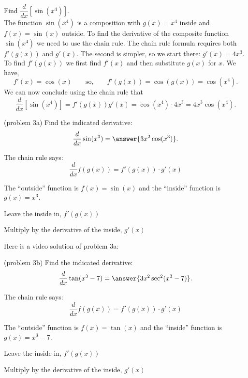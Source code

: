 \documentclass[handout]{ximera}
\begin{document}
\begin{example}[example 3]
Find $\dfrac{d}{dx}\left[\sin(x^4)\right]$.\\
The function $\sin(x^4)$ is a composition with $g(x) = x^4$ inside and $f(x) = \sin(x)$ outside.
To find the derivative of the composite function $\sin(x^4)$ we need to use the chain rule.
The chain rule formula requires both $f'(g(x))$ and $g'(x)$. The second is simpler, so we start there: $g'(x) = 4x^3$.
To find $f'(g(x))$ we first find $f'(x)$ and then substitute $g(x)$ for $x$. 
We have, 
\[
f'(x) = \cos(x) \qquad \mbox{so,} \qquad f'(g(x)) = \cos(g(x)) = \cos(x^4).
\]
We can now conclude using the chain rule that
\[
\frac{d}{dx}\left[\sin(x^4)\right] = f'(g(x))g'(x) = \cos(x^4) \cdot 4x^3 = 4x^3\cos(x^4).
\]
\end{example}

\begin{problem}(problem 3a)
Find the indicated derivative:
  \[
  \frac{d}{dx} \sin(x^3) = \answer{3x^2\cos(x^3)}.
  \]
    \begin{hint}
      The chain rule says:
      \[
      \frac{d}{dx} f(g(x)) = f'(g(x))\cdot g'(x)
      \]
    \end{hint}
    \begin{hint}
      The ``outside'' function is $f(x) = \sin(x)$ and the ``inside''
      function is $g(x) = x^3$.
    \end{hint}
    \begin{hint}
		  Leave the inside in, $f'(g(x))$
		\end{hint}
		\begin{hint}
		  Multiply by the derivative of the inside, $g'(x)$
		\end{hint} 
\end{problem}
Here is a video solution of  problem 3a:
\begin{foldable}
\end{foldable}

\begin{problem}(problem 3b)
Find the indicated derivative:
  \[
  \frac{d}{dx} \tan(x^3 - 7) = \answer{3x^2 \sec^2(x^3 - 7)}.
  \]
    \begin{hint}
      The chain rule says:
      \[
      \frac{d}{dx} f(g(x)) = f'(g(x))\cdot g'(x)
      \]
    \end{hint}
    \begin{hint}
      The ``outside'' function is $f(x) = \tan(x)$ and the ``inside''
      function is $g(x) = x^3 - 7$.
    \end{hint}
    \begin{hint}
		  Leave the inside in, $f'(g(x))$
		\end{hint}
		\begin{hint}
		  Multiply by the derivative of the inside, $g'(x)$
		\end{hint} 
\end{problem}
\end{document}
